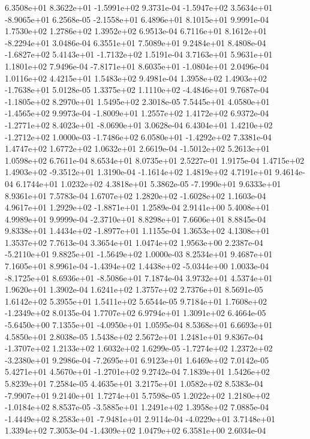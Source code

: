  6.3508e+01  8.3622e+01 -1.5991e+02  9.3731e-04
-1.5947e+02  3.5634e+01 -8.9065e+01  6.2568e-05
-2.1558e+01  6.4896e+01  8.1015e+01  9.9991e-04
1.7530e+02 1.2786e+02 1.3952e+02  6.9513e-04
 6.7116e+01  8.1612e+01 -8.2294e+01  3.0486e-04
6.3551e+01 7.5089e+01 9.2484e+01  8.4808e-04
-1.6827e+02  5.4143e+01 -1.7132e+02  1.5191e-04
3.7163e+01 5.9631e+01 1.1801e+02  7.9496e-04
-7.8171e+01  8.6035e+01 -1.0804e+01  2.0496e-04
1.0116e+02 4.4215e+01 1.5483e+02  9.4981e-04
 1.3958e+02  1.4903e+02 -1.7638e+01  5.0128e-05
 1.3375e+02  1.1110e+02 -4.4846e+01  9.7687e-04
-1.1805e+02  8.2970e+01  1.5495e+02  2.3018e-05
 7.5445e+01  4.0580e+01 -1.4565e+02  9.9973e-04
-1.8009e+01  1.2557e+02  1.4172e+02  6.9372e-04
-1.2771e+02  8.4023e+01 -8.0690e+01  3.0628e-04
 6.4304e+01  1.4210e+02 -1.2712e+02  1.0000e-03
-1.7486e+02  6.0580e+01 -1.4292e+02  7.3381e-04
1.4747e+02 1.6772e+02 1.0632e+01  2.6619e-04
-1.5012e+02  5.2613e+01  1.0598e+02  6.7611e-04
8.6534e+01 8.0735e+01 2.5227e-01  1.9175e-04
 1.4715e+02  1.4903e+02 -9.3512e+01  1.3190e-04
-1.1614e+02  1.4819e+02  4.7191e+01  9.4614e-04
6.1744e+01 1.0232e+02 4.3818e+01  5.3862e-05
-7.1990e+01  9.6333e+01  8.9361e+01  7.5783e-04
 1.6707e+02  1.2820e+02 -1.6028e+02  1.1603e-04
 4.9617e+01  1.2929e+02 -1.8871e+01  1.2589e-04
2.9141e+00 5.4008e+01 4.9989e+01  9.9999e-04
-2.3710e+01  8.8298e+01  7.6606e+01  8.8845e-04
 9.8338e+01  1.4434e+02 -1.8977e+01  1.1155e-04
1.3653e+02 4.1308e+01 1.3537e+02  7.7613e-04
3.3654e+01 1.0474e+02 1.9563e+00  2.2387e-04
-5.2110e+01  9.8825e+01 -1.5649e+02  1.0000e-03
8.2534e+01 9.4687e+01 7.1605e+01  8.9961e-04
-1.4394e+02  1.4438e+02 -5.0344e+00  1.0033e-04
-8.1725e+01  8.6936e+01 -8.5086e+01  7.1874e-04
3.9732e+01 4.5374e+01 1.9620e+01  1.3902e-04
1.6241e+02 1.3757e+02 2.7376e+01  8.5691e-05
1.6142e+02 5.3955e+01 1.5411e+02  5.6544e-05
 9.7184e+01  1.7608e+02 -1.2349e+02  8.0135e-04
1.7707e+02 6.9794e+01 1.3091e+02  6.4664e-05
-5.6450e+00  7.1355e+01 -4.0950e+01  1.0595e-04
8.5368e+01 6.6693e+01 4.5850e+01  2.8038e-05
1.5438e+02 2.5672e+01 1.2481e+01  9.8367e-04
-1.3707e+02  1.2133e+02  1.6032e+02  1.6299e-05
-1.7274e+02  1.2372e+02 -3.2380e+01  9.2986e-04
-7.2695e+01  6.9123e+01  1.6469e+02  7.0142e-05
 5.4271e+01  4.5670e+01 -1.2701e+02  9.2742e-04
7.1839e+01 1.5426e+02 5.8239e+01  7.2584e-05
4.4635e+01 3.2175e+01 1.0582e+02  8.5383e-04
-7.9907e+01  9.2140e+01  1.7274e+01  5.7598e-05
 1.2022e+02  1.2180e+02 -1.0184e+02  8.8537e-05
-3.5885e+01  1.2491e+02  1.3958e+02  7.0885e-04
-1.4449e+02  8.2583e+01 -7.9481e+01  2.9114e-04
-4.0229e+01  3.7148e+01  1.3394e+02  7.3053e-04
-1.4309e+02  1.0479e+02  6.3581e+00  2.6034e-04
